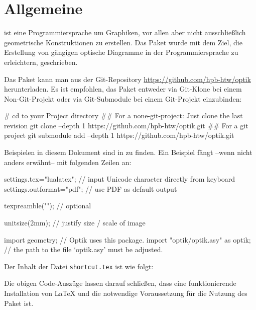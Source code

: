 \chapter{Allgemeine}

\asypmtote\cite{Asymptote} ist eine Programmiersprache um Graphiken, vor allen aber nicht ausschließlich geometrische Konstruktionen zu erstellen.
Das Paket \optik{} wurde mit dem Ziel, die Erstellung von gängigen optische Diagramme in der Programmiersprache \asypmtote{} zu erleichtern, geschrieben.

Das Paket kann man aus der Git-Repository \url{https://github.com/hpb-htw/optik} herunterladen.
Es ist empfohlen, das Paket entweder via Git-Klone bei einem Non-Git-Projekt oder via Git-Submodule bei einem Git-Projekt einzubinden:

\begin{shellcode}
#  cd to your Project directory
## For a none-git-project: Just clone the last revision
git clone --depth 1 https://github.com/hpb-htw/optik.git
## For a git project
git submodule add --depth 1 https://github.com/hpb-htw/optik.git
\end{shellcode}

Beispielen in diesem Dokument sind in \repo{} zu finden. 
Ein Beispiel fängt --wenn nicht anders erwähnt-- mit folgenden Zeilen an:

\begin{asycode}
settings.tex="lualatex";  // input Unicode character directly from keyboard
settings.outformat="pdf"; // use PDF as default output

texpreamble(""); // optional

unitsize(2mm);                       // justify size / scale of image

import geometry;                     // Optik uses this package.
import "optik/optik.asy" as optik;   // the path to the file `optik.asy' must be adjusted.
\end{asycode}


Der Inhalt der Datei \verb|shortcut.tex| ist wie folgt:

\begin{texcode}
\newcommand{\pLabel}[1]{\mathsf{#1}}
\newcommand{\tLabel}[1]{\textsf{#1}}
\end{texcode}


Die obigen Code-Auszüge lassen darauf schließen, 
dass eine funktionierende Installation von \LaTeX{} und \asypmtote{} die notwendige Voraussetzung für die Nutzung des Paket \optik{} ist.



